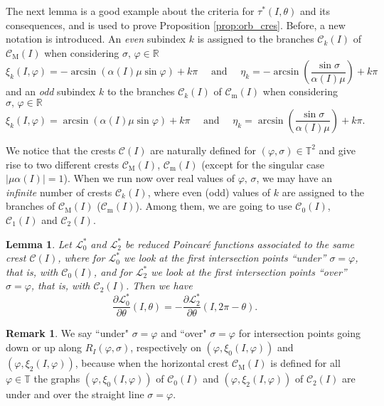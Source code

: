 \documentclass[a4paper,10pt]{article}
\newcommand{\M}{\text{M}}
\newcommand{\m}{\text{m}}
\newcommand{\zeroM}{\text{0}}
\newcommand{\oneM}{\text{2}}
\newtheorem{lemma}[theorem]{Lemma}
\theoremstyle{definition}
\newtheorem{remark}[theorem]{Remark}
\begin{document}
The next lemma is a good example about the criteria for $\tau^*(I,\theta)$ and its consequences, and is used to prove Proposition \ref{prop:orb_cres}.
Before, a new notation is introduced.
An \emph{even} subindex $k$ is assigned to the branches $\mathcal{C}_k(I)$ of $\mathcal{C}_{\M}(I)$ when considering $\sigma,\,\varphi \in\mathbb{R}$
\begin{equation*}
\xi_{k}(I,\varphi) = -\arcsin\left(\alpha(I)\mu\sin\varphi\right) + k\pi\quad\text{ and  }\quad\eta_{k} = -\arcsin\left(\frac{\sin\sigma}{\alpha(I)\mu}\right) + k\pi
\end{equation*}
and an \emph{odd} subindex $k$ to the branches $\mathcal{C}_k(I)$ of $\mathcal{C}_{\m}(I)$ when considering $\sigma,\,\varphi \in\mathbb{R}$
\begin{equation*}
\xi_{k}(I,\varphi) = \arcsin\left(\alpha(I)\mu\sin\varphi\right) + k\pi\quad\text{ and  }\quad\eta_{k} = \arcsin\left(\frac{\sin\sigma}{\alpha(I)\mu}\right) + k\pi.
\end{equation*}

We notice that the crests $\mathcal{C}(I)$ are naturally defined for $(\varphi,\sigma)\in\mathbb{T}^2$ and give rise to two different crests $\mathcal{C}_{\M}(I)$, $\mathcal{C}_{\m}(I)$ (except for the singular case $\left|\mu\alpha(I)\right| = 1$).
When we run now over real values of $\varphi,\,\sigma$, we may have an \emph{infinite} number of crests $\mathcal{C}_k(I)$, where even (odd) values of $k$ are assigned to the branches of $\mathcal{C}_{\M}(I)$ ($\mathcal{C}_{\m}(I)$). Among them,
we are going to use $\mathcal{C}_{0}(I)$, $\mathcal{C}_{1}(I)$ and $\mathcal{C}_{2}(I)$.

\begin{lemma}Let $\mathcal{L}_{\zeroM}^*$ and $\mathcal{L}_{\oneM}^*$ be reduced Poincar\'{e} functions associated to the same crest $\mathcal{C}(I)$, where for $\mathcal{L}_{\zeroM}^*$ we look at the first intersection points ``under'' $\sigma = \varphi$, that is, with $\mathcal{C}_0(I)$, and for $\mathcal{L}_{\oneM}^*$ we look at the first intersection points ``over'' $\sigma = \varphi$, that is, with $\mathcal{C}_2(I)$.
Then we have
\begin{equation}
\frac{\partial\mathcal{L}_{\zeroM}^*}{\partial\theta}\left(I,\theta\right) = -\frac{\partial\mathcal{L}_{\oneM}^*}{\partial\theta}\left(I,2\pi - \theta\right).\label{eq:lemma}
\end{equation}
\end{lemma}

\begin{remark}
We say ``under"  $\sigma = \varphi$  and ``over" $\sigma = \varphi$ for intersection points going down or up along $R_I(\varphi,\sigma)$, respectively on $(\varphi , \xi_{0}(I,\varphi))$ and $(\varphi,\xi_{2}(I,\varphi))$, because when the horizontal crest $\mathcal{C}_{\M}(I)$ is defined for all $\varphi\in\mathbb{T}$ the graphs $(\varphi , \xi_{0}(I,\varphi))$ of $\mathcal{C}_0(I)$ and  $(\varphi,\xi_{2}(I,\varphi))$ of $\mathcal{C}_2(I)$ are under and over the straight line $\sigma = \varphi$.
\end{remark}
\end{document}
